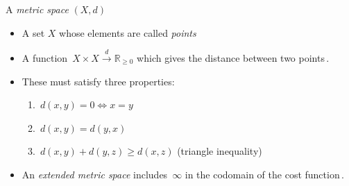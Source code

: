 A \emph{metric space} $(X,d)$

\begin{itemize}
    \item  A set $X$ whose elements are called \emph{points}
    \item A function \,$X \times X \xrightarrow{d} \mathbb{R}_{\geq 0}$ which gives the distance between two points\,.
    \item These must satisfy three properties:
          \begin{enumerate}
            \item \,$d(x,y)=0 \iff x=y$\,
            \item \,$d(x,y)=d(y,x)$\,
            \item \,$d(x,y)+d(y,z)\geq d(x,z)$ (triangle inequality)\,
          \end{enumerate}
    \item An \emph{extended metric space} includes \,$\infty$ in the codomain of the cost function\,.
  \end{itemize}
